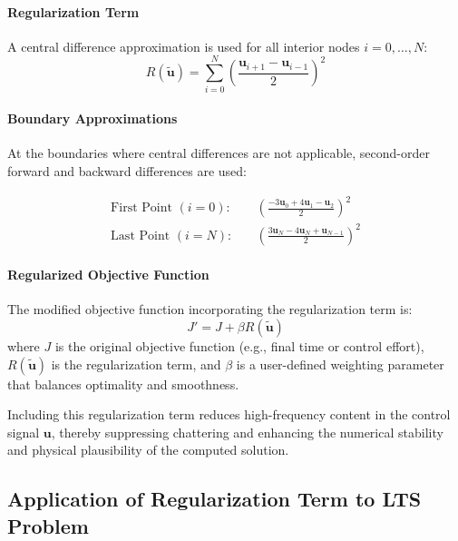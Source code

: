 \paragraph{Regularization Term}
A central difference approximation is used for all interior nodes \( i = 0, \dots, N \):
\begin{equation}
R(\mathbf{\tilde{u}}) = \sum_{i=0}^{N} \left( \frac{\mathbf{{u}}_{i+1} - \mathbf{u}_{i-1}}{2} \right)^2
\label{eq:central_diff_reg}
\end{equation}

\paragraph{Boundary Approximations}
At the boundaries where central differences are not applicable, second-order forward and backward differences are used:

\begin{align}
\text{First Point } (i = 0): \quad & \left( \frac{-3\mathbf{u}_0 + 4\mathbf{u}_1 - \mathbf{u}_2}{2} \right)^2
\label{eq:forward_diff} \\
\text{Last Point } (i = N): \quad & \left( \frac{3\mathbf{u}_{N} - 4\mathbf{u}_N + \mathbf{u}_{N-1}}{2} \right)^2
\label{eq:backward_diff}
\end{align}

\paragraph{Regularized Objective Function}
The modified objective function incorporating the regularization term is:
\begin{equation}
J' = J + \beta R(\mathbf{\tilde{u}})
\label{eq:reg_objective}
\end{equation}
where \( J \) is the original objective function (e.g., final time or control effort), \( R(\mathbf{\tilde{u}}) \) is the regularization term, and \( \beta \) is a user-defined weighting parameter that balances optimality and smoothness.

Including this regularization term reduces high-frequency content in the control signal \( \mathbf{u} \), thereby suppressing chattering and enhancing the numerical stability and physical plausibility of the computed solution.


\subsection{Application of Regularization Term to LTS Problem}

